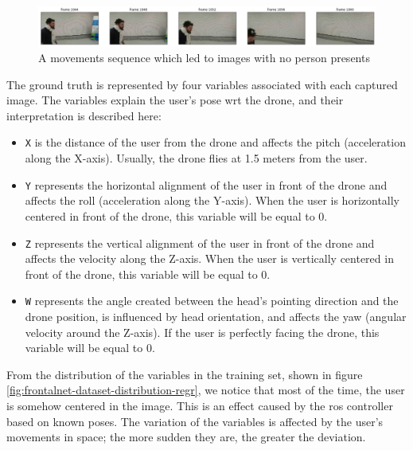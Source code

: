 \begin{figure}[!htb]
\centering
\includegraphics[width=1\textwidth]{"contents/images/03-data-missing"}
\caption[A movements sequence which led to images with no person presents]{A movements sequence which led to images with no person presents}
\label{fig:frontalnet-dataset-missing}
\end{figure}

The ground truth is represented by four variables associated with each captured image. The variables explain the user's pose \gls{wrt} the drone, and their interpretation is described here:

\begin{itemize}
	\item \texttt{X} is the distance of the user from the drone and affects the pitch (acceleration along the X-axis). Usually, the drone flies at 1.5 meters from the user.
	\item \texttt{Y} represents the horizontal alignment of the user in front of the drone and affects the roll (acceleration along the Y-axis). When the user is horizontally centered in front of the drone, this variable will be equal to 0.
	\item \texttt{Z} represents the vertical alignment of the user in front of the drone and affects the velocity along the Z-axis. When the user is vertically centered in front of the drone, this variable will be equal to 0.
	\item \texttt{W} represents the angle created between the head's pointing direction and the drone position, is influenced by head orientation, and affects the yaw (angular velocity around the Z-axis). If the user is perfectly facing the drone, this variable will be equal to 0.
\end{itemize}

From the distribution of the variables in the training set, shown in figure \ref{fig:frontalnet-dataset-distribution-regr}, we notice that most of the time, the user is somehow centered in the image. This is an effect caused by the \gls{ros} controller based on known poses. The variation of the variables is affected by the user's movements in space; the more sudden they are, the greater the deviation.

